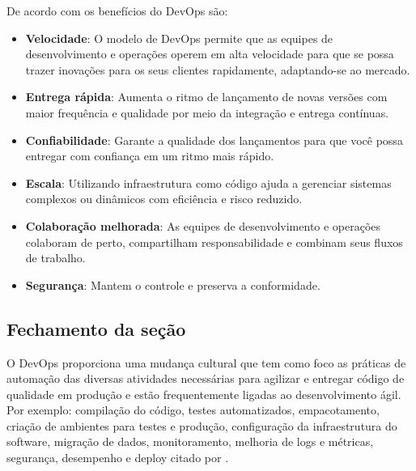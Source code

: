 De acordo com \cite{amazon} os benefícios do DevOps são:

\begin{itemize}
  \item \textbf{Velocidade}: O modelo de DevOps permite que as equipes de desenvolvimento e operações operem em alta velocidade para que se possa trazer inovações para os seus clientes rapidamente, adaptando-se ao mercado.
  \item \textbf{Entrega rápida}: Aumenta o ritmo de lançamento de novas versões com maior frequência e qualidade por meio da integração e entrega contínuas.
  \item \textbf{Confiabilidade}: Garante a qualidade dos lançamentos para que você possa entregar com confiança em um ritmo mais rápido.
  \item \textbf{Escala}: Utilizando infraestrutura como código ajuda a gerenciar sistemas complexos ou dinâmicos com eficiência e risco reduzido.
  \item \textbf{Colaboração melhorada}: As equipes de desenvolvimento e operações colaboram de perto, compartilham responsabilidade e combinam seus fluxos de trabalho.
  \item \textbf{Segurança}: Mantem o controle e preserva a conformidade.
\end{itemize}

\subsection{Fechamento da seção}

O DevOps proporciona uma mudança cultural que tem como foco as práticas de automação das diversas atividades necessárias para agilizar e entregar código de qualidade em produção e estão frequentemente ligadas ao desenvolvimento ágil. Por exemplo: compilação do código, testes automatizados, empacotamento, criação de ambientes para testes e produção, configuração da infraestrutura do software, migração de dados, monitoramento, melhoria de logs e métricas, segurança, desempenho e deploy \cite{sato} citado por \cite{correa}.
